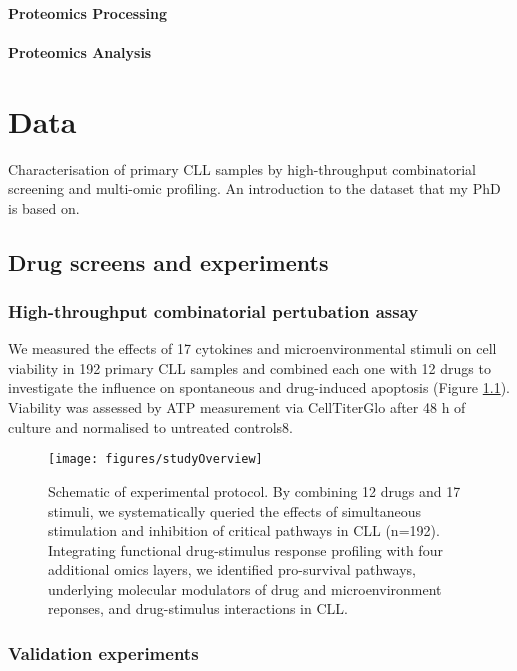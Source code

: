 \documentclass[11pt, a4paper, twosided]{book}
\begin{document}
\hypertarget{proteomics-processing}{%
\subsubsection{Proteomics Processing}\label{proteomics-processing}}

\hypertarget{proteomics-analysis}{%
\subsubsection{Proteomics Analysis}\label{proteomics-analysis}}

\hypertarget{data}{%
\chapter{Data}\label{data}}

Characterisation of primary CLL samples by high-throughput combinatorial screening and multi-omic profiling. An introduction to the dataset that my PhD is based on.

\hypertarget{drug-screens-and-experiments}{%
\section{Drug screens and experiments}\label{drug-screens-and-experiments}}

\hypertarget{high-throughput-combinatorial-pertubation-assay}{%
\subsection{High-throughput combinatorial pertubation assay}\label{high-throughput-combinatorial-pertubation-assay}}

We measured the effects of 17 cytokines and microenvironmental stimuli on cell viability in 192 primary CLL samples and combined each one with 12 drugs to investigate the influence on spontaneous and drug-induced apoptosis (Figure \ref{fig:studyOverview}). Viability was assessed by ATP measurement via CellTiterGlo after 48 h of culture and normalised to untreated controls8.


\begin{figure}

{\centering \texttt{[image: figures/studyOverview]} 

}

\caption{Schematic of experimental protocol. By combining 12 drugs and 17 stimuli, we systematically queried the effects of simultaneous stimulation and inhibition of critical pathways in CLL (n=192). Integrating functional drug-stimulus response profiling with four additional omics layers, we identified pro-survival pathways, underlying molecular modulators of drug and microenvironment reponses, and drug-stimulus interactions in CLL.}\label{fig:studyOverview}
\end{figure}
\hypertarget{validation-experiments}{%
\subsection{Validation experiments}\label{validation-experiments}}
\end{document}
